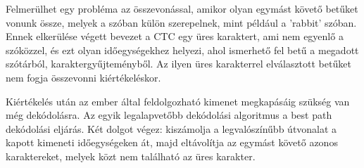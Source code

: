 
Felmerülhet egy probléma az összevonással, amikor olyan egymást követő betűket vonunk össze, melyek a szóban külön szerepelnek, mint például a ’rabbit’ szóban. Ennek elkerülése végett bevezet a CTC egy üres karaktert, ami nem egyenlő a szóközzel, és ezt olyan időegységekhez helyezi, ahol ismerhető fel betű a megadott szótárból, karaktergyűjteményből. Az ilyen üres karakterrel elválasztott betűket nem fogja összevonni kiértékeléskor.

Kiértékelés után az ember által feldolgozható kimenet megkapásáig szükség van még dekódolásra. Az egyik legalapvetőbb dekódolási algoritmus a best path dekódolási eljárás. Két dolgot végez: kiszámolja a legvalószínűbb útvonalat a kapott kimeneti időegységeken át, majd eltávolítja az egymást követő azonos karaktereket, melyek közt nem található az üres karakter.
